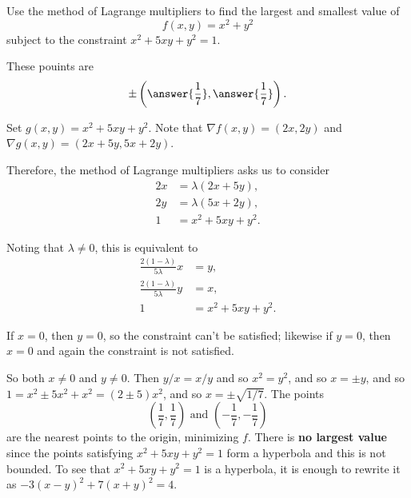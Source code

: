 \documentclass{ximera}
\author{Jim Fowler}
\begin{document}
\begin{exercise}
  Use the method of Lagrange multipliers to find the largest and
  smallest value of
  $$
  f(x,y) = x^2 + y^2
  $$
  subject to the constraint $x^2 + 5 xy + y^2 = 1$.

  These pouints are
  \[
    \pm \left( \answer{\frac{1}{7}}, \answer{\frac{1}{7}} \right).
  \]
  
  \begin{hint}
Set $g(x,y) = x^2 + 5xy + y^2$.  Note that $\nabla f(x,y) = (2x,2y)$ and $\nabla g(x,y) = (2x + 5y, 5x + 2y)$.
\end{hint}

  \begin{hint}
Therefore, the method of Lagrange multipliers asks us to consider
\begin{align*}
  2x &= \lambda( 2x + 5y ), \\
  2y &= \lambda( 5x + 2y ), \\
  1 &= x^2 + 5xy + y^2.
\end{align*}
\end{hint}

\begin{hint}
Noting that $\lambda \neq 0$, this is equivalent to
\begin{align*}
  \frac{2 (1 - \lambda)}{5 \lambda} x &= y, \\
  \frac{2 (1 - \lambda)}{5 \lambda} y &= x, \\
  1 &= x^2 + 5xy + y^2.
\end{align*}
\end{hint}

\begin{hint}
  If $x = 0$, then $y = 0$, so the constraint can't be satisfied; likewise if $y = 0$, then $x = 0$ and again the constraint is not satisfied.
\end{hint}

\begin{hint}
  So both $x \neq 0$ and $y \neq 0$.   Then $y/x = x/y$ and so $x^2 = y^2$, and so $x = \pm y$, and so $1 = x^2 \pm 5x^2 + x^2 = (2 \pm 5) x^2$, and so $x = \pm \sqrt{1/7}$.  The points
$$
\left( \frac{1}{7}, \frac{1}{7} \right) \mbox{ and } \left( -\frac{1}{7}, -\frac{1}{7} \right)
$$
are the nearest points to the origin, minimizing $f$.  There is \textbf{no largest value} since the points satisfying $x^2 + 5 xy + y^2 = 1$ form a hyperbola and this is not bounded.  To see that $x^2 + 5xy + y^2 = 1$ is a hyperbola, it is enough to rewrite it as $-3 (x-y)^2 + 7 (x+y)^2 = 4$.
\end{hint}


\end{exercise}
\end{document}
